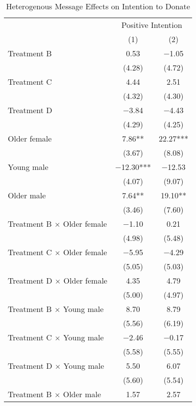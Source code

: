 \documentclass[12pt, a4paper]{article}
\begin{document}
\begin{table}[H]

\caption{\label{tab:int-lm-interaction-reg}Heterogenous Message Effects on Intention to Donate}
\centering
\fontsize{8}{10}\selectfont
\begin{threeparttable}
\begin{tabular}[t]{lcc}
\toprule
\multicolumn{1}{c}{ } & \multicolumn{2}{c}{Positive Intention} \\
\cmidrule(l{3pt}r{3pt}){2-3}
  & (1) & (2)\\
\midrule
Treatment B & \num{0.53} & \num{-1.05}\\
 & (\num{4.28}) & (\num{4.72})\\
Treatment C & \num{4.44} & \num{2.51}\\
 & (\num{4.32}) & (\num{4.30})\\
Treatment D & \num{-3.84} & \num{-4.43}\\
 & (\num{4.29}) & (\num{4.25})\\
Older female & \num{7.86}** & \num{22.27}***\\
 & (\num{3.67}) & (\num{8.08})\\
Young male & \num{-12.30}*** & \num{-12.53}\\
 & (\num{4.07}) & (\num{9.07})\\
Older male & \num{7.64}** & \num{19.10}**\\
 & (\num{3.46}) & (\num{7.60})\\
Treatment B $\times$ Older female & \num{-1.10} & \num{0.21}\\
 & (\num{4.98}) & (\num{5.48})\\
Treatment C $\times$ Older female & \num{-5.95} & \num{-4.29}\\
 & (\num{5.05}) & (\num{5.03})\\
Treatment D $\times$ Older female & \num{4.35} & \num{4.79}\\
 & (\num{5.00}) & (\num{4.97})\\
Treatment B $\times$ Young male & \num{8.70} & \num{8.79}\\
 & (\num{5.56}) & (\num{6.19})\\
Treatment C $\times$ Young male & \num{-2.46} & \num{-0.17}\\
 & (\num{5.58}) & (\num{5.55})\\
Treatment D $\times$ Young male & \num{5.50} & \num{6.07}\\
 & (\num{5.60}) & (\num{5.54})\\
Treatment B $\times$ Older male & \num{1.57} & \num{2.57}\\

\end{tabular}
\end{threeparttable}
\end{table}
\end{document}
